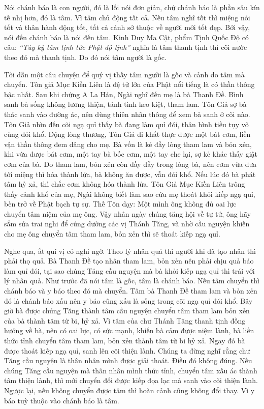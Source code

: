 \documentclass[
  12pt,
  oneside]{book}
\begin{document}
Nói chánh báo là con người, đó là lối nói đơn giản, chứ chánh báo là phần sâu kín tế nhị hơn, đó là tâm. Vì tâm chủ động tất cả. Nếu tâm nghĩ tốt thì miệng nói tốt và thân hành động tốt, tất cả cảnh sở thuộc về người mới tốt đẹp. Bởi vậy, nói đến chánh báo là nói đến tâm. Kinh Duy Ma Cật, phẩm Tịnh Quốc Độ có câu: \emph{``Tùy kỳ tâm tịnh tức Phật độ tịnh''} nghĩa là tâm thanh tịnh thì cõi nước theo đó mà thanh tịnh. Do đó nói tâm người là gốc.

Tôi dẫn một câu chuyện để quý vị thấy tâm người là gốc và cảnh do tâm mà chuyển. Tôn giả Mục Kiền Liên là đệ tử lớn của Phật nổi tiếng là có thần thông bậc nhất. Sau khi chứng A La Hán, Ngài nghĩ đến mẹ là bà Thanh Đề. Bình sanh bà sống không lương thiện, tánh tình keo kiệt, tham lam. Tôn Giả sợ bà thác sanh vào đường ác, nên dùng thiên nhãn thông để xem bà sanh ở cõi nào. Tôn Giả nhìn đến cõi ngạ quỉ thấy bà đang làm quỉ đói, thân hình tiều tụy vô cùng đói khổ. Động lòng thương, Tôn Giả đi khất thực được một bát cơm, liền vận thần thông đem dâng cho mẹ. Bà vốn là kẻ đầy lòng tham lam và bỏn xẻn, khi vừa được bát cơm, một tay bà bốc cơm, một tay che lại, sợ kẻ khác thấy giật cơm của bà. Do tham lam, bỏn xẻn còn đầy dẫy trong lòng bà, nên cơm vừa đưa tới miệng thì hóa thành lửa, bà không ăn được, vẫn đói khổ. Nếu lúc đó bà phát tâm hỷ xả, thì chắc cơm không hóa thành lửa. Tôn Giả Mục Kiền Liên trông thấy cảnh khổ của mẹ, Ngài không biết làm sao cứu mẹ thoát khỏi kiếp ngạ quỉ, bèn trở về Phật bạch tự sự. Thế Tôn dạy: Một mình ông không đủ oai lực chuyển tâm niệm của mẹ ông. Vậy nhân ngày chúng tăng hội về tự tứ, ông hãy sắm sửa trai nghi để cúng dường các vị Thánh Tăng, và nhờ cầu nguyện khiến cho mẹ ông chuyển tâm tham lam, bỏn xẻn thì sẽ thoát kiếp ngạ quỉ.

Nghe qua, ắt quí vị có nghi ngờ. Theo lý nhân quả thì người khi đã tạo nhân thì phải thọ quả. Bà Thanh Đề tạo nhân tham lam, bỏn xẻn nên phải chịu quả báo làm quỉ đói, tại sao chúng Tăng cầu nguyện mà bà khỏi kiếp ngạ quỉ thì trái với lý nhân quả. Như trước đã nói tâm là gốc, tâm là chánh báo. Nếu tâm chuyển thì chánh báo và y báo theo đó mà chuyển. Tâm bà Thanh Đề tham lam và bỏn xẻn đó là chánh báo xấu nên y báo cũng xấu là sống trong cõi ngạ quỉ đói khổ. Bây giờ bà được chúng Tăng thành tâm cầu nguyện chuyển tâm tham lam bỏn xẻn của bà thành tâm từ bi, hỷ xả. Vì tâm của chư Thánh Tăng thanh tịnh đồng hướng về bà, nên có oai lực, có sức mạnh, khiến bà cảm được niệm lành, bà liền thức tỉnh chuyển tâm tham lam, bỏn xẻn thành tâm từ bi hỷ xả. Ngay đó bà được thoát kiếp ngạ quỉ, sanh lên cõi thiện lành. Chúng ta đừng nghĩ rằng chư Tăng cầu nguyện là thân nhân mình được giải thoát. Điều đó không đúng. Nếu chúng Tăng cầu nguyện mà thân nhân mình thức tỉnh, chuyển tâm xấu ác thành tâm thiện lành, thì mới chuyển đổi được kiếp đọa lạc mà sanh vào cõi thiện lành. Ngược lại, nếu không chuyển được tâm thì hoàn cảnh cũng không đổi thay. Vì y báo tuỳ thuộc vào chánh báo là tâm.
\end{document}
